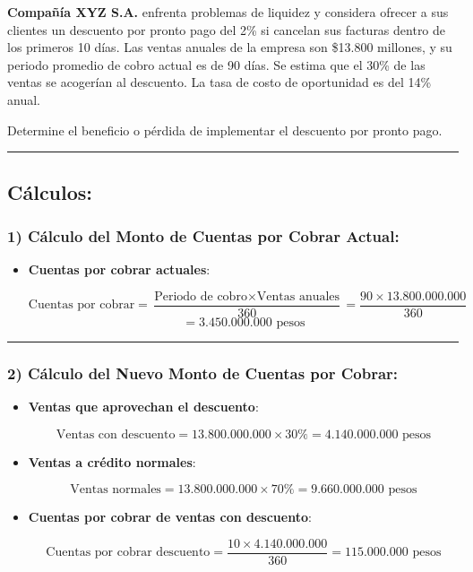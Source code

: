 \documentclass[
  letterpaper,
  DIV=11,
  numbers=noendperiod]{scrartcl}
\begin{document}
\textbf{Compañía XYZ S.A.} enfrenta problemas de liquidez y considera
ofrecer a sus clientes un descuento por pronto pago del 2\% si cancelan
sus facturas dentro de los primeros 10 días. Las ventas anuales de la
empresa son \$13.800 millones, y su periodo promedio de cobro actual es
de 90 días. Se estima que el 30\% de las ventas se acogerían al
descuento. La tasa de costo de oportunidad es del 14\% anual.

Determine el beneficio o pérdida de implementar el descuento por pronto
pago.

\begin{center}\rule{0.5\linewidth}{0.5pt}\end{center}

\subsection{Cálculos:}\label{cuxe1lculos-2}

\subsubsection{1) Cálculo del Monto de Cuentas por Cobrar
Actual:}\label{cuxe1lculo-del-monto-de-cuentas-por-cobrar-actual}

\begin{itemize}
\item
  \textbf{Cuentas por cobrar actuales}:

  \[
  \text{Cuentas por cobrar} = \frac{\text{Periodo de cobro} \times \text{Ventas anuales}}{360} = \frac{90 \times 13.800.000.000}{360} 
  \] \[
  = 3.450.000.000 \text{ pesos}
  \]
\end{itemize}

\begin{center}\rule{0.5\linewidth}{0.5pt}\end{center}

\subsubsection{2) Cálculo del Nuevo Monto de Cuentas por
Cobrar:}\label{cuxe1lculo-del-nuevo-monto-de-cuentas-por-cobrar}

\begin{itemize}
\item
  \textbf{Ventas que aprovechan el descuento}:

  \[
  \text{Ventas con descuento} = 13.800.000.000 \times 30\% = 4.140.000.000 \text{ pesos}
  \]
\item
  \textbf{Ventas a crédito normales}:

  \[
  \text{Ventas normales} = 13.800.000.000 \times 70\% = 9.660.000.000 \text{ pesos}
  \]
\item
  \textbf{Cuentas por cobrar de ventas con descuento}:

  \[
  \text{Cuentas por cobrar descuento} = \frac{10 \times 4.140.000.000}{360} = 115.000.000 \text{ pesos}
  \]
\end{itemize}
\end{document}
